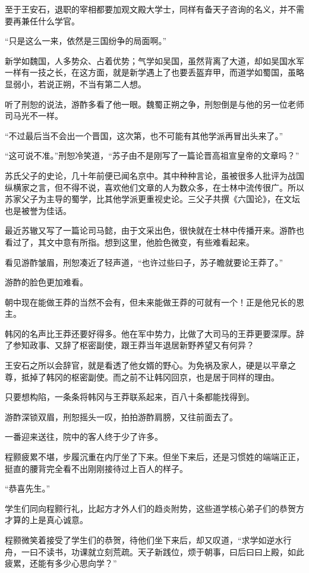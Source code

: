 至于王安石，退职的宰相都要加观文殿大学士，同样有备天子咨询的名义，并不需要再兼任什么学官。

“只是这么一来，依然是三国纷争的局面啊。”

新学如魏国，人多势众、占着优势；气学如吴国，虽然背离了大道，却如吴国水军一样有一技之长，在这方面，就是新学遇上了也要丢盔弃甲，而道学如蜀国，虽略显弱小，若说正朔，不当有第二人想。

听了刑恕的说法，游酢多看了他一眼。魏蜀正朔之争，刑恕倒是与他的另一位老师司马光不一样。

“不过最后当不会出一个晋国，这次第，也不可能有其他学派再冒出头来了。”

“这可说不准。”刑恕冷笑道，“苏子由不是刚写了一篇论晋高祖宣皇帝的文章吗？”

苏氏父子的史论，几十年前便已闻名京中。其中种种言论，虽被很多人批评为战国纵横家之言，但不得不说，喜欢他们文章的人为数众多，在士林中流传很广。所以苏家父子为主导的蜀学，比其他学派更重视史论。三父子共撰《六国论》，在文坛也是被誉为佳话。

最近苏辙又写了一篇论司马懿，由于文采出色，很快就在士林中传播开来。游酢也看过了，其文中意有所指。想到这里，他脸色微变，有些难看起来。

看见游酢皱眉，刑恕凑近了轻声道，“也许过些曰子，苏子瞻就要论王莽了。”

游酢的脸色更加难看。

朝中现在能做王莽的当然不会有，但未来能做王莽的可就有一个！正是他兄长的恩主。

韩冈的名声比王莽还要好得多。他在军中势力，比做了大司马的王莽更要深厚。辞了参知政事、又辞了枢密副使，跟王莽当年退居新野养望又有何异？

王安石之所以会辞官，就是看透了他女婿的野心。为免祸及家人，硬是以平章之尊，抵掉了韩冈的枢密副使。而之前不让韩冈回京，也是居于同样的理由。

只要想构陷，一条条将韩冈与王莽联系起来，百八十条都能找得到。

游酢深锁双眉，刑恕摇头一叹，拍拍游酢肩膀，又往前面去了。

一番迎来送往，院中的客人终于少了许多。

程颢疲累不堪，步履沉重在内厅坐了下来。但坐下来后，还是习惯姓的端端正正，挺直的腰背完全看不出刚刚接待过上百人的样子。

“恭喜先生。”

学生们同向程颢行礼，比起方才外人们的趋炎附势，这些道学核心弟子们的恭贺方才算的上是真心诚意。

程颢微笑着接受了学生们的恭贺，待他们坐下来后，却又叹道，“求学如逆水行舟，一曰不读书，功课就立刻荒疏。天子新践位，烦于朝事，曰后曰曰上殿，如此疲累，还能有多少心思向学？”

